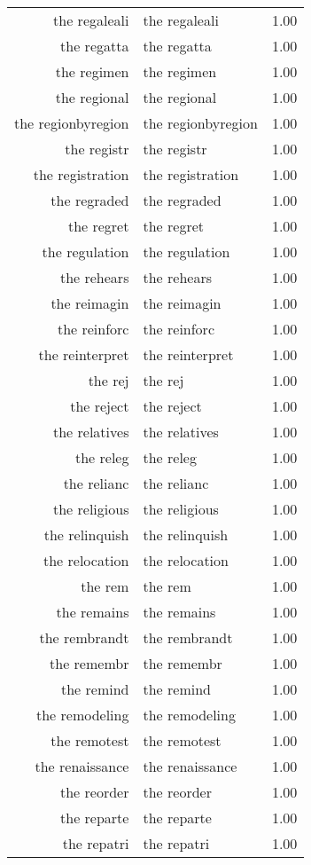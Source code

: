 \begin{table}[ht]
\begin{tabular}{rlr}
  the regaleali & the regaleali & 1.00 \\ 
  the regatta & the regatta & 1.00 \\ 
  the regimen & the regimen & 1.00 \\ 
  the regional & the regional & 1.00 \\ 
  the regionbyregion & the regionbyregion & 1.00 \\ 
  the registr & the registr & 1.00 \\ 
  the registration & the registration & 1.00 \\ 
  the regraded & the regraded & 1.00 \\ 
  the regret & the regret & 1.00 \\ 
  the regulation & the regulation & 1.00 \\ 
  the rehears & the rehears & 1.00 \\ 
  the reimagin & the reimagin & 1.00 \\ 
  the reinforc & the reinforc & 1.00 \\ 
  the reinterpret & the reinterpret & 1.00 \\ 
  the rej & the rej & 1.00 \\ 
  the reject & the reject & 1.00 \\ 
  the relatives & the relatives & 1.00 \\ 
  the releg & the releg & 1.00 \\ 
  the relianc & the relianc & 1.00 \\ 
  the religious & the religious & 1.00 \\ 
  the relinquish & the relinquish & 1.00 \\ 
  the relocation & the relocation & 1.00 \\ 
  the rem & the rem & 1.00 \\ 
  the remains & the remains & 1.00 \\ 
  the rembrandt & the rembrandt & 1.00 \\ 
  the remembr & the remembr & 1.00 \\ 
  the remind & the remind & 1.00 \\ 
  the remodeling & the remodeling & 1.00 \\ 
  the remotest & the remotest & 1.00 \\ 
  the renaissance & the renaissance & 1.00 \\ 
  the reorder & the reorder & 1.00 \\ 
  the reparte & the reparte & 1.00 \\ 
  the repatri & the repatri & 1.00 \\ 

\end{tabular}
\end{table}
